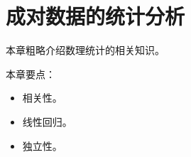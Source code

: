 \chapter{成对数据的统计分析}

本章粗略介绍数理统计的相关知识。

本章要点：
\begin{itemize}
    \item 相关性。
    \item 线性回归。
    \item 独立性。
\end{itemize}

\newpage


\newpage


\newpage


\newpage


\newpage





